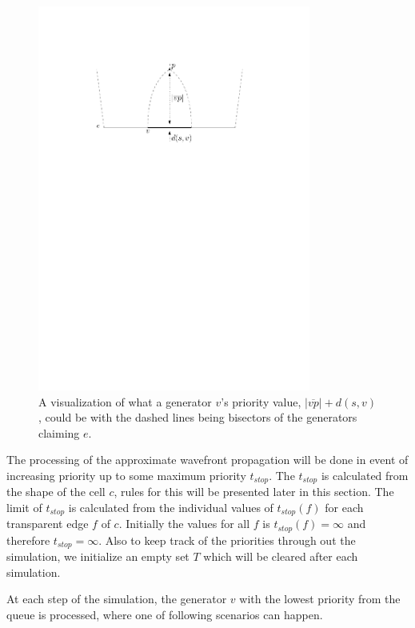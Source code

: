 \begin{figure}[H]
	\centering
	\includegraphics[width=0.8\textwidth]{figures/priorityvalue.pdf}
	\caption{A visualization of what a generator $v$'s priority value, $|\overline{vp}| + d(s,v)$, could be with the
	         dashed lines being bisectors of the generators claiming $e$.}
	\label{fig:priorityvalue}
\end{figure}

The processing of the approximate wavefront propagation will be done in event of increasing priority up to some maximum priority 
$t_{stop}$. The $t_{stop}$ is calculated from the shape of the cell $c$, rules for this will be presented later in this section. 
The limit of $t_{stop}$ is calculated from the individual values of $t_{stop}(f)$ for each transparent edge $f$ of $c$. Initially
the values for all $f$ is $t_{stop}(f) = \infty$ and therefore $t_{stop} = \infty$. Also to keep track of the priorities through 
out the simulation, we initialize an empty set $T$ which will be cleared after each simulation.

At each step of the simulation, the generator $v$ with the lowest priority from the queue is processed, where one of following 
scenarios can happen.

